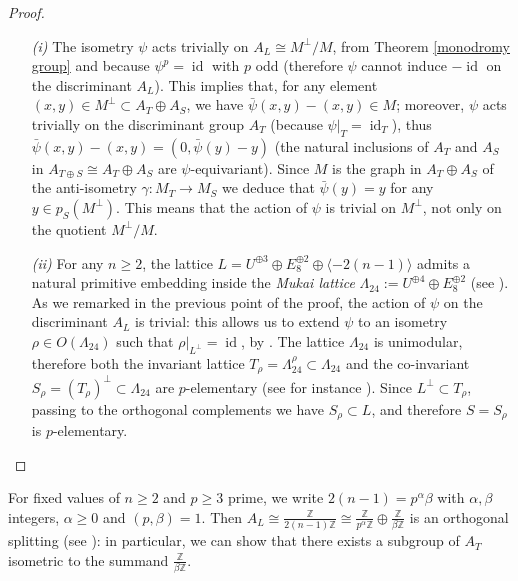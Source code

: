 \documentclass{amsart}
\theoremstyle{definition}
\newcommand{\ra}{\rightarrow}
\newcommand{\IZ}{\mathbb{Z}}
\newcommand{\coloneqq}{:=}
\DeclareMathOperator{\id}{id}
\begin{document}
\begin{proof}
\begin{enumerate}
\item[\textit{(i)}]The isometry $\psi$ acts trivially on $A_L \cong M^\perp/M$, from Theorem \ref{monodromy group} and because $\psi^p = \id$ with $p$ odd (therefore $\psi$ cannot induce $-\id$ on the discriminant $A_L$). This implies that, for any element $(x,y) \in M^\perp \subset A_T \oplus A_S$, we have $\bar{\psi}(x,y) - (x,y) \in M$; moreover, $\psi$ acts trivially on the discriminant group $A_T$ (because $\psi\vert_T = \id_T$), thus $\bar{\psi}(x,y) - (x,y) = (0, \bar{\psi}(y)-y)$ (the natural inclusions of $A_T$ and $A_S$ in $A_{T \oplus S} \cong A_T \oplus A_S$ are $\psi$-equivariant). Since $M$ is the graph in $A_T \oplus A_S$ of the anti-isometry $\gamma : M_T \ra M_S$ we deduce that $\bar{\psi}(y)=y$ for any $y \in p_S(M^\perp)$. This means that the action of $\psi$ is trivial on $M^\perp$, not only on the quotient $M^\perp/M$. 

\item[\textit{(ii)}] For any $n \geq 2$, the lattice $L = U^{\oplus 3}\oplus E_8^{\oplus 2} \oplus \langle-2(n-1)\rangle$ admits a natural primitive embedding inside the \emph{Mukai lattice} $\Lambda_{24} \coloneqq U^{\oplus 4}\oplus E_8^{\oplus 2}$ (see \cite[Corollary 9.5]{markman}). As we remarked in the previous point of the proof, the action of $\psi$ on the discriminant $A_L$ is trivial: this allows us to extend $\psi$ to an isometry $\rho \in O(\Lambda_{24})$ such that $\rho\vert_{L^\perp} = \id$, by \cite[Corollary 1.5.2]{nikulin}. The lattice $\Lambda_{24}$ is unimodular, therefore both the invariant lattice \mbox{$T_\rho = \Lambda_{24}^\rho \subset \Lambda_{24}$} and the co-invariant $S_\rho = (T_\rho)^\perp \subset \Lambda_{24}$ are $p$-elementary (see for instance \cite[Lemme 2.10]{tari}). Since $L^\perp \subset T_\rho$, passing to the orthogonal complements we have $S_\rho \subset L$, and therefore $S = S_\rho$ is $p$-elementary.\qedhere
\end{enumerate}
\end{proof}

For fixed values of $n \geq 2$ and $p \geq 3$ prime, we write $2(n-1) = p^\alpha \beta$ with $\alpha, \beta$ integers, $\alpha \geq 0$ and $(p, \beta) = 1$. Then $A_L \cong \frac{\IZ}{2(n-1)\IZ} \cong \frac{\IZ}{p^\alpha \IZ} \oplus \frac{\IZ}{\beta \IZ}$ is an orthogonal splitting (see \cite[Proposition 1.2.2]{nikulin}): in particular, we can show that there exists a subgroup of $A_T$ isometric to the summand $\frac{\IZ}{\beta \IZ}$.
\end{document}
